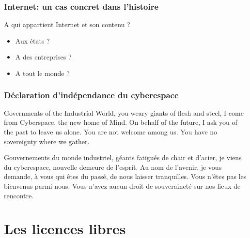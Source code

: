 \documentclass{beamer}
\begin{document}
\begin{frame}
	\frametitle{Internet: un cas concret dans l'histoire}
	
	A qui appartient Internet et son contenu ?
	
	\begin{itemize}
		\item<2-> Aux états ?
		\item<3-> A des entreprises ?
		\item<4-> A tout le monde ?
	\end{itemize}

	\vspace{2em}
	
	\begin{flushright}
	\end{flushright}
\end{frame}

\begin{frame}
	\frametitle{Déclaration d'indépendance du cyberespace}
	
	Governments of the Industrial World, you weary giants of flesh and steel, I come from Cyberspace, the new home of Mind. On behalf of the future, I ask you of the past to leave us alone. You are not welcome among us. You have no sovereignty where we gather.
	
	\vspace{2em}
	
	Gouvernements du monde industriel, géants fatigués de chair et d’acier, je viens du cyberespace, nouvelle demeure de l’esprit. Au nom de l’avenir, je vous demande, à vous qui êtes du passé, de nous laisser tranquilles. Vous n’êtes pas les bienvenus parmi nous. Vous n’avez aucun droit de souveraineté sur nos lieux de rencontre.
	
\end{frame}

\section{Les licences libres}
\end{document}
